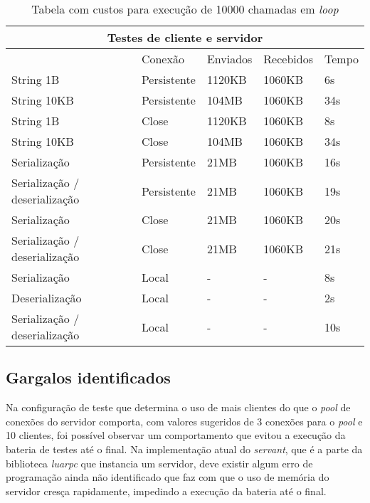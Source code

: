 \documentclass[11pt]{article}
\begin{document}
\renewcommand{\arraystretch}{2}
\begin{table}
\begin{center}
{\footnotesize \begin{tabular}{p{2.5cm} p{2.5cm} p{2.5cm} p{2.5cm} p{2.5cm}}
\hline
\multicolumn{5}{c}{Testes de cliente e servidor} \\ \hline
~ & Conexão & Enviados & Recebidos & Tempo \\ \hline
String 1B & Persistente & 1120KB & 1060KB & 6s \\
String 10KB & Persistente & 104MB & 1060KB & 34s \\
String 1B & Close & 1120KB & 1060KB & 8s \\
String 10KB & Close & 104MB & 1060KB & 34s \\
Serialização & Persistente & 21MB & 1060KB & 16s \\
Serialização / deserialização & Persistente & 21MB & 1060KB & 19s \\
Serialização & Close & 21MB & 1060KB & 20s \\
Serialização / deserialização & Close & 21MB & 1060KB & 21s \\
Serialização & Local & - & - & 8s \\
Deserialização & Local & - & - & 2s \\
Serialização / deserialização & Local & - & - & 10s \\
\hline
\end{tabular}}
\caption{Tabela com custos para execução de 10000 chamadas em \textit{loop}}
\label{tab:perf}
\end{center}
\end{table}

\subsection{Gargalos identificados}\label{subsec:bottle}

Na configuração de teste que determina o uso de mais clientes do que o
\textit{pool} de conexões do servidor comporta, com valores sugeridos de 3
conexões para o \textit{pool} e 10 clientes, foi possível observar um
comportamento que evitou a execução da bateria de testes até o final. Na
implementação atual do \textit{servant}, que é a parte da biblioteca
\textit{luarpc} que instancia um servidor, deve existir algum erro de
programação ainda não identificado que faz com que o uso de memória do servidor
cresça rapidamente, impedindo a execução da bateria até o final.
\end{document}
